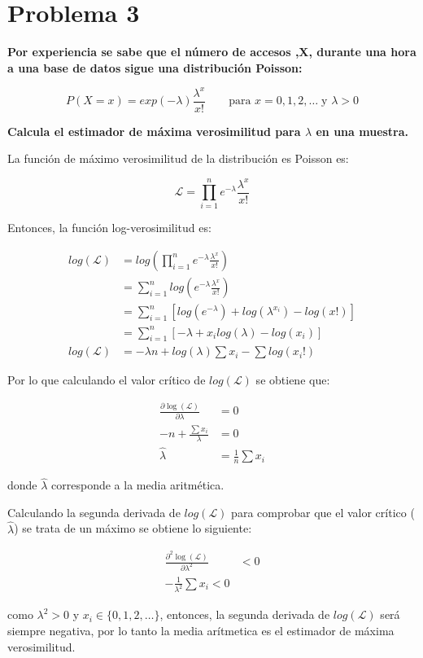 \section*{Problema 3}

\textbf{Por experiencia se sabe que el número de  accesos ,X, durante una hora a una base de datos sigue una distribución Poisson:}

\begin{equation*}
	P(X=x) = exp(-\lambda) \frac{\lambda^x}{x!} \qquad \text{para } x=0,1,2,\dots \; \text{y } \lambda>0
\end{equation*}

\textbf{Calcula el estimador de máxima verosimilitud para $\lambda$ en una muestra.}

La función de máximo verosimilitud de la distribución es Poisson es:

\begin{equation*}
	\mathcal{L} = \prod_{i=1}^n e^{-\lambda} \frac{\lambda^x}{x!}
\end{equation*}

Entonces, la función log-verosimilitud es:

\begin{align*}
	log(\mathcal{L}) & = log\left (\prod_{i=1}^n e^{-\lambda} \frac{\lambda^x}{x!}\right )            \\
	                 & = \sum_{i=1}^n log \left ( e^{-\lambda} \frac{\lambda^x}{x!}\right )           \\
	                 & = \sum_{i=1}^n \left [ log(e^{-\lambda})+ log(\lambda^{x_i}) -log(x!) \right ] \\
	                 & = \sum_{i=1}^n \left [ -\lambda +x_i log(\lambda) -log(x_i)\right ]            \\
	log(\mathcal{L}) & = -\lambda n + log(\lambda) \sum x_i - \sum log(x_i!)
\end{align*}

Por lo que calculando el valor crítico de $log(\mathcal{L})$ se obtiene que:

\begin{align*}
	\frac{\partial \log(\mathcal{L})}{\partial \lambda} & = 0                    \\
	-n  + \frac{\sum x_i}{\lambda}                      & = 0                    \\
	\hat{\lambda}                                       & = \frac{1}{n} \sum x_i
\end{align*}

donde $\hat{\lambda}$ corresponde a la media aritmética.

Calculando la segunda derivada de $log(\mathcal{L})$ para comprobar que el valor crítico ($\hat{\lambda}$) se trata de un máximo se obtiene lo siguiente:

\begin{align*}
	\frac{\partial^2 \log(\mathcal{L})}{\partial \lambda^2} & < 0 \\
	-\frac{1}{\lambda^2} \sum x_i  < 0
\end{align*}

como $\lambda^2 > 0$ y $x_i \in \{0,1,2,\dots\}$, entonces, la segunda derivada de $log(\mathcal{L})$ será siempre negativa, por lo tanto la media arítmetica es el estimador de máxima verosimilitud.
